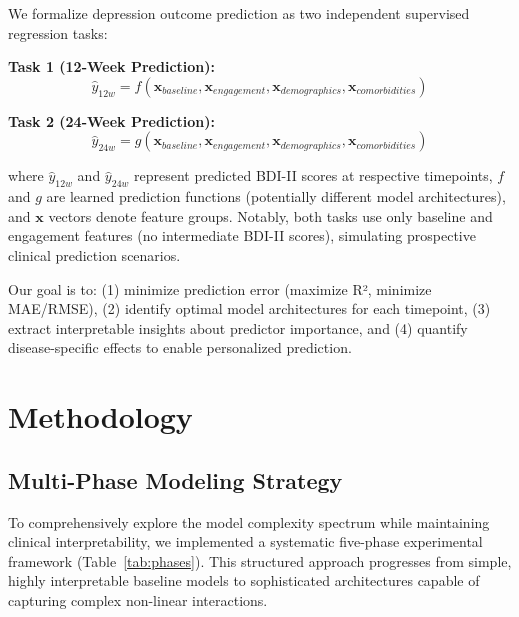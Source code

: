 \documentclass[conference]{IEEEtran}
\begin{document}
We formalize depression outcome prediction as two independent supervised regression tasks:

\textbf{Task 1 (12-Week Prediction):}
\[
\hat{y}_{12w} = f(\mathbf{x}_{baseline}, \mathbf{x}_{engagement}, \mathbf{x}_{demographics}, \mathbf{x}_{comorbidities})
\]

\textbf{Task 2 (24-Week Prediction):}
\[
\hat{y}_{24w} = g(\mathbf{x}_{baseline}, \mathbf{x}_{engagement}, \mathbf{x}_{demographics}, \mathbf{x}_{comorbidities})
\]

where $\hat{y}_{12w}$ and $\hat{y}_{24w}$ represent predicted BDI-II scores at respective timepoints, $f$ and $g$ are learned prediction functions (potentially different model architectures), and $\mathbf{x}$ vectors denote feature groups. Notably, both tasks use only baseline and engagement features (no intermediate BDI-II scores), simulating prospective clinical prediction scenarios.

Our goal is to: (1) minimize prediction error (maximize R², minimize MAE/RMSE), (2) identify optimal model architectures for each timepoint, (3) extract interpretable insights about predictor importance, and (4) quantify disease-specific effects to enable personalized prediction.

\section{Methodology}

\subsection{Multi-Phase Modeling Strategy}

To comprehensively explore the model complexity spectrum while maintaining clinical interpretability, we implemented a systematic five-phase experimental framework (Table~\ref{tab:phases}). This structured approach progresses from simple, highly interpretable baseline models to sophisticated architectures capable of capturing complex non-linear interactions.
\end{document}
